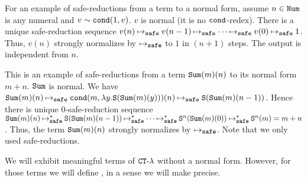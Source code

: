 



\begin{example}
For an example of safe-reductions from a term to a normal form, 
assume $n \in {\tt Num}$ is any numeral and $v \sim {\tt cond}(1, v)$.
$v$ is normal (it is no ${\tt cond}$-redex).
There is a unique safe-reduction sequence
$v(n) \safeReduces v(n-1) \safeReduces \cdots \safeReduces v(0) \safeReduces 1$. 
Thus, $v(n)$ strongly normalizes by $\safeReduces$ to $1$ in $(n+1)$ steps.
The output is independent from $n$.
\end{example}

\begin{example}
This is an example of safe-reductions from a term ${\tt Sum}(m)(n)$ to
its normal form $m+n$. 
${\tt Sum}$ is normal.
We have $\Sum(m)(n) \safeReduces \cond(m,\lambda y.\Succ(\Sum(m)(y)))(n) \safeReduces \Succ(\Sum(m)(n-1))$.
Hence there is unique $0$-safe-reduction sequence 
$\Sum(m)(n) \safeReducesAst \Succ(\Sum(m)(n-1)) \safeReducesAst \cdots \safeReducesAst \Succ^n(\Sum(m)(0)) \safeReducesAst \Succ^n(m) = m+n$.
Thus, the term ${\tt Sum}(m)(n)$ strongly normalizes by $\safeReduces$.
Note that we only used safe-reductions.
\end{example}

We will exhibit meaningful terms of ${ {\tt CT}\mbox{-}\lambda}$ without a normal form. 
However, for those terms we will define ,
in a sense we will make precise.

